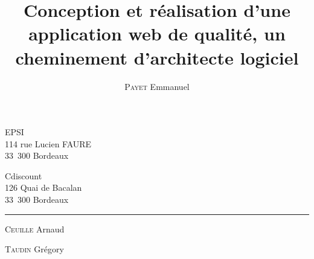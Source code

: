 \newcommand*{\TitleStyle}[1]{%
      \usefont{\encodingdefault}{\rmdefault}{b}{n}%
      \fontsize{17}{20}%
      \selectfont%
      \textbf{#1}}

\title{\TitleStyle{Conception et réalisation d’une application web de qualité, un cheminement d’architecte logiciel}}
\author{\textsc{Payet} Emmanuel}
\makeatletter

\vspace*{1cm}
\begin{minipage}{.5\textwidth}
    EPSI\\
     114 rue Lucien FAURE\\
     33 300 Bordeaux
\end{minipage}
\begin{minipage}{.5\textwidth}
    \begin{flushright}
        Cdiscount\\
        126 Quai de Bacalan\\
        33 300 Bordeaux
    \end{flushright}
\end{minipage}

\begin{center}
    \vspace*{7cm}
    \textsc{\@title}
    \HRule
    \vspace*{0.5cm}
    \large{\@author}
\end{center}

\vfill

\rule{\textwidth}{0.2mm}
\begin{minipage}{.33\textwidth}
    \textsc{Ceuille} Arnaud
\end{minipage}
\begin{minipage}{.33\textwidth}
    \begin{center}
        \@date
    \end{center}
\end{minipage}
\begin{minipage}{.33\textwidth}
    \begin{flushright}
        \textsc{Taudin} Grégory
    \end{flushright}
\end{minipage}
